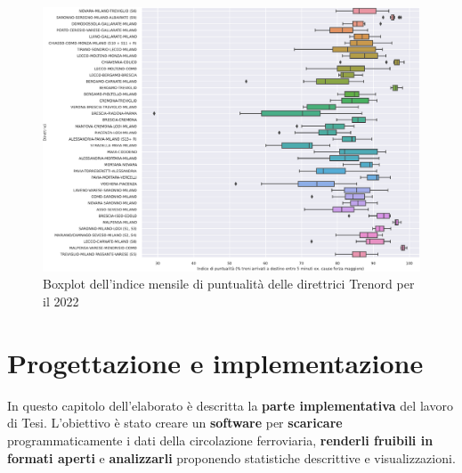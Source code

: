 \documentclass[12pt,italian]{report}
\begin{document}
\begin{figure}
    \centering
    \includegraphics[width=1\textwidth]{images/lomb_boxplot.pdf}
    \caption{Boxplot dell'indice mensile di puntualità delle
        direttrici Trenord per il 2022}
    \label{figure:lomb_boxplot}
\end{figure}

\chapter{Progettazione e implementazione}

In questo capitolo dell'elaborato è descritta la \textbf{parte
    implementativa} del lavoro di Tesi.  L'obiettivo è stato creare un
\textbf{software} per \textbf{scaricare} programmaticamente i dati
della circolazione ferroviaria, \textbf{renderli fruibili in formati
    aperti}
e \textbf{analizzarli} proponendo statistiche descrittive e
visualizzazioni.
\end{document}
